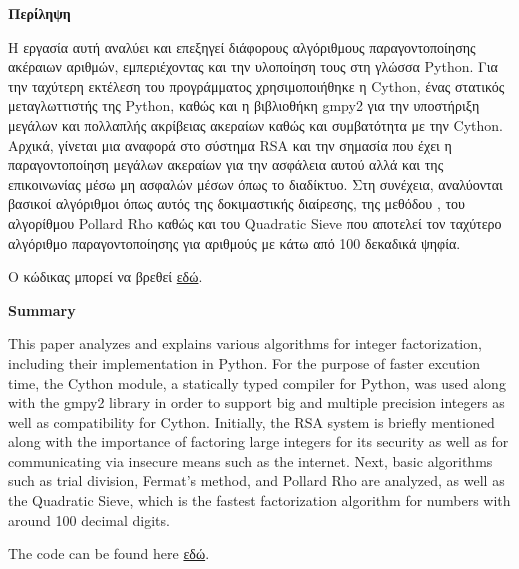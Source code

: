 \documentclass[12pt]{article}
\numberwithin{equation}{section}
\newcommand\blankpage{%
    \null
    \thispagestyle{empty}%
    \addtocounter{page}{-1}%
    \newpage}
\newcommand{\lt}{\latintext}
\begin{document}
\tableofcontents

\clearpage

\blankpage

\begin{center}
    {\textbf{\Large{Περίληψη}}}
\end{center}
\vspace{0.5cm}

Η εργασία αυτή αναλύει και επεξηγεί διάφορους αλγόριθμους παραγοντοποίησης ακέραιων αριθμών, εμπεριέχοντας και την υλοποίηση τους στη γλώσσα Python. Για την ταχύτερη εκτέλεση του προγράμματος χρησιμοποιήθηκε η Cython, ένας στατικός μεταγλωττιστής της Python, καθώς και η βιβλιοθήκη gmpy2 για την υποστήριξη μεγάλων και πολλαπλής ακρίβειας ακεραίων καθώς και συμβατότητα με την Cython.  Αρχικά, γίνεται μια αναφορά στο σύστημα RSA και την σημασία που έχει η παραγοντοποίηση μεγάλων ακεραίων για την ασφάλεια αυτού αλλά και της επικοινωνίας μέσω μη ασφαλών μέσων όπως το διαδίκτυο. Στη συνέχεια, αναλύονται βασικοί αλγόριθμοι  όπως αυτός της δοκιμαστικής διαίρεσης, της μεθόδου \lt{Fermat}, του αλγορίθμου Pollard Rho καθώς και του Quadratic Sieve που αποτελεί τον ταχύτερο αλγόριθμο παραγοντοποίησης για αριθμούς με κάτω από 100 δεκαδικά ψηφία.

Ο κώδικας μπορεί να βρεθεί \href{https://github.com/inco0/Factorization}{εδώ}.

\newpage

\begin{center}
    {\textbf{\Large{Summary}}}
\end{center}
\vspace{0.5cm}


This paper analyzes and explains various algorithms for integer factorization, including their implementation in Python. For the purpose of faster excution time, the Cython module, a statically typed compiler for Python, was used along with the gmpy2 library in order to support big and multiple precision integers as well as compatibility for Cython. Initially, the RSA system is briefly mentioned along with the importance of factoring large integers for its security as well as for communicating via insecure means such as the internet. Next, basic algorithms such as trial division, Fermat's method, and Pollard Rho are analyzed, as well as the Quadratic Sieve, which is the fastest factorization algorithm for numbers with around 100 decimal digits.

The code can be found here \href{https://github.com/inco0/Factorization}{εδώ}.
\end{document}
